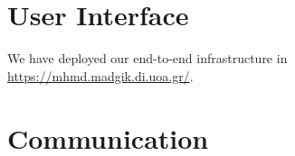 
\section{User Interface}\label{s:impl-ui}

We have deployed our end\hyp to\hyp end infrastructure in \href{https://mhmd.madgik.di.uoa.gr/}{https://mhmd.madgik.di.uoa.gr/}.





\section{Communication}\label{s:impl-communication}


